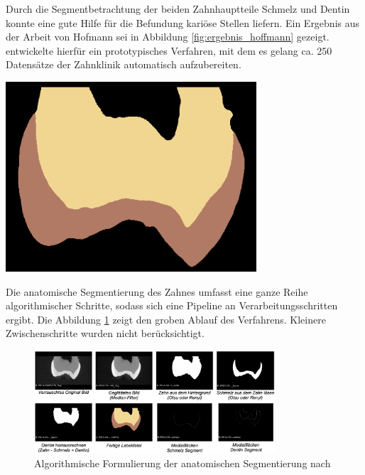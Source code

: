 \begin{minipage}{0.40\textwidth}
	Durch die Segmentbetrachtung der beiden Zahnhauptteile Schmelz und Dentin konnte
	\citet[S.~41]{hoffmann2020} eine gute Hilfe für die Befundung kariöse Stellen
	liefern. Ein Ergebnis aus der Arbeit von Hofmann sei in Abbildung \ref{fig:ergebnis_hoffmann}
	gezeigt. \citet[S.~53]{hoffmann2020} entwickelte hierfür ein prototypisches Verfahren,
	mit dem es gelang ca. 250 Datensätze der Zahnklinik automatisch aufzubereiten.
\end{minipage}
\hfill
\begin{minipage}{0.50\textwidth}
	\centering
	\includegraphics[width=0.7\textwidth]{img/ergebnis_hoffmann_2.jpg}
	\label{fig:ergebnis_hoffmann}
\end{minipage}

Die anatomische Segmentierung des Zahnes umfasst eine ganze Reihe algorithmischer
Schritte, sodass sich eine Pipeline an Verarbeitungsschritten ergibt. Die Abbildung
\ref{fig:anatomische_segmentierung} zeigt den groben Ablauf des Verfahrens.
Kleinere Zwischenschritte wurden nicht berücksichtigt.

\begin{figure}[h]
	\centering
	\includegraphics[width=0.8\textwidth]{img/anatomischeSegmentierung.png}
	\caption{Algorithmische Formulierung der anatomischen Segmentierung nach
	\citet{hoffmann2020}}
	\label{fig:anatomische_segmentierung}
\end{figure}


